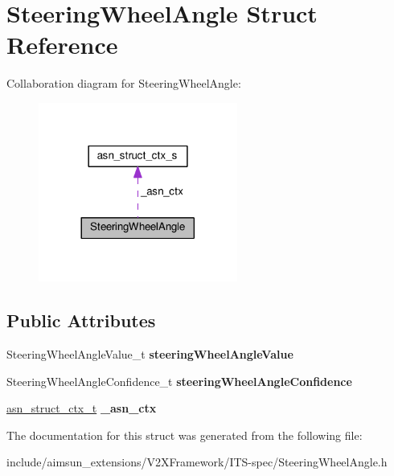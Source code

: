 \hypertarget{structSteeringWheelAngle}{}\section{Steering\+Wheel\+Angle Struct Reference}
\label{structSteeringWheelAngle}


Collaboration diagram for Steering\+Wheel\+Angle\+:\nopagebreak
\begin{figure}[H]
\begin{center}
\leavevmode
\includegraphics[width=185pt]{structSteeringWheelAngle__coll__graph}
\end{center}
\end{figure}
\subsection*{Public Attributes}
\begin{DoxyCompactItemize}
\item 
Steering\+Wheel\+Angle\+Value\+\_\+t {\bfseries steering\+Wheel\+Angle\+Value}\hypertarget{structSteeringWheelAngle_abf2d5d8ae6d0eccad737dc338609f540}{}\label{structSteeringWheelAngle_abf2d5d8ae6d0eccad737dc338609f540}

\item 
Steering\+Wheel\+Angle\+Confidence\+\_\+t {\bfseries steering\+Wheel\+Angle\+Confidence}\hypertarget{structSteeringWheelAngle_a06ef7fdbc8f4a704aa26d8438e5f7343}{}\label{structSteeringWheelAngle_a06ef7fdbc8f4a704aa26d8438e5f7343}

\item 
\hyperlink{structasn__struct__ctx__s}{asn\+\_\+struct\+\_\+ctx\+\_\+t} {\bfseries \+\_\+asn\+\_\+ctx}\hypertarget{structSteeringWheelAngle_a2bdbd4b90e45d170c8ab56d1cc8cd2ec}{}\label{structSteeringWheelAngle_a2bdbd4b90e45d170c8ab56d1cc8cd2ec}

\end{DoxyCompactItemize}


The documentation for this struct was generated from the following file\+:\begin{DoxyCompactItemize}
\item 
include/aimsun\+\_\+extensions/\+V2\+X\+Framework/\+I\+T\+S-\/spec/Steering\+Wheel\+Angle.\+h\end{DoxyCompactItemize}
